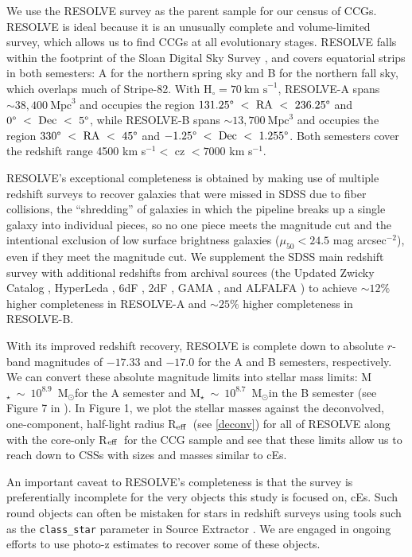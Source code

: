 \documentclass[iop,apj]{emulateapj}
\newcommand{\Reff}{R$_{\rm eff}$}
\newcommand{\Msun}{M$_{\odot}$}
\begin{document}
\noindent We use the RESOLVE survey \citep[][Kannappan et al., in prep]{Kannappan2008} as the parent sample for our census of CCGs. RESOLVE is ideal because it is an unusually complete and volume-limited survey, which allows us to find CCGs at all evolutionary stages. RESOLVE falls within the footprint of the Sloan Digital Sky Survey \citep[SDSS,][]{York2000}, and covers equatorial strips in both semesters: A for the northern spring sky and B for the northern fall sky, which overlaps much of Stripe-82. With $\text{H}_{\circ} = 70~\text{km~s}^{-1}$, RESOLVE-A spans $\sim38,400~\text{Mpc}^3$ and occupies the region $131.25\degree~<~\text{RA}~<~236.25\degree$ and $0\degree~<~\text{Dec}~<~5\degree$, while RESOLVE-B spans $\sim13,700~\text{Mpc}^3$ and occupies the region $330\degree~<~\text{RA}~<~45\degree$ and $-1.25\degree~<~\text{Dec}~<~1.255\degree$. Both semesters cover the redshift range 4500 km s$^{-1} <$ cz $< 7000$ km s$^{-1}$.

RESOLVE's exceptional completeness is obtained by making use of multiple redshift surveys to recover galaxies that were missed in SDSS due to fiber collisions, the ``shredding'' of galaxies in which the pipeline breaks up a single galaxy into individual pieces, so no one piece meets the magnitude cut and the intentional exclusion of low surface brightness galaxies ($\mu_{50} < 24.5$ mag arcsec$^{-2}$), even if they meet the magnitude cut. We supplement the SDSS main redshift survey with additional redshifts from archival sources (the Updated Zwicky Catalog \citep{Falco1999}, HyperLeda \citep{Paturel2003}, 6dF \citep{Jones2009}, 2dF \citep{Colless2001}, GAMA \citep{Driver2011}, and ALFALFA \citep{Haynes2011}) to achieve $\sim12\%$ higher completeness in RESOLVE-A and $\sim25\%$ higher completeness in RESOLVE-B.

With its improved redshift recovery, RESOLVE is complete down to absolute $r$-band magnitudes of $-17.33$ and $-17.0$ for the A and B semesters, respectively. We can convert these absolute magnitude limits into stellar mass limits: M$_{\star}~\sim~10^{8.9}$~\Msun for the A semester and M$_{\star}~\sim~10^{8.7}$~\Msun in the B semester (see Figure 7 in \citet{Eckert2016}). In Figure 1, we plot the stellar masses against the deconvolved, one-component, half-light radius \Reff\ (see \autoref{deconv}) for all of RESOLVE along with the core-only \Reff\ for the CCG sample and see that these limits allow us to reach down to CSSs with sizes and masses similar to cEs.

An important caveat to RESOLVE's completeness is that the survey is preferentially incomplete for the very objects this study is focused on, cEs. Such round objects can often be mistaken for stars in redshift surveys using tools such as the \texttt{class\_star} parameter in Source Extractor \citep{Bertin1996}. We are engaged in ongoing efforts to use photo-z estimates to recover some of these objects.
\end{document}
